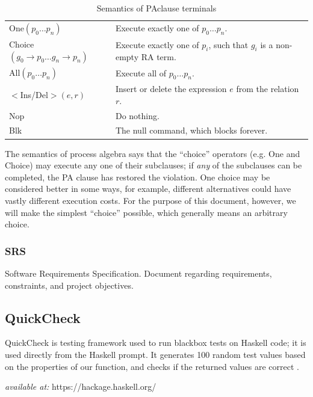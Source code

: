 \documentclass[12pt, svgnames]{article}
\begin{document}
\begin{table}[ht!]\begin{center}\label{tab:PASemantics}
        \caption{Semantics of PAclause terminals}
        \begin{tabularx}{\textwidth}{lX}
            One$(p_0 \ldots p_n)$ & Execute exactly one of $p_0 \ldots p_n$. \\
            Choice$(g_0 \rightarrow p_0 \ldots g_n \rightarrow p_n)$ & Execute 
            exactly
            one of $p_i$, such that $g_i$ is a non-empty RA term. \\
            All$(p_0 \ldots p_n)$ & Execute all of $p_0 \ldots p_n$. \\
            $<$Ins/Del$>(e,r)$ & Insert or delete the expression $e$ from the 
            relation $r$. \\
            Nop & Do nothing. \\
            Blk & The null command, which blocks forever. 
        \end{tabularx}
    \end{center}\end{table}
    
    The semantics of process algebra says that the ``choice'' operators (e.g. 
    One
    and Choice) may execute any one of their subclauses; if \emph{any} of the
    subclauses can be completed, the PA clause has restored the violation.  One
    choice may be considered better in some ways, for example, different
    alternatives could have vastly different execution costs. For the purpose of
    this document, however, we will make the simplest ``choice'' possible, which
    generally means an arbitrary choice. 

\subsubsection*{SRS}
Software Requirements Specification. Document regarding requirements, 
constraints, and project objectives.

\subsection*{QuickCheck}
QuickCheck is testing framework used to run blackbox tests on Haskell code; it 
is used directly from the Haskell prompt. It generates 100 random test values 
based on the properties of our function, and checks if the returned values are 
correct \cite{rwhaskell}.

\textit{available at:} https://hackage.haskell.org/
\end{document}
